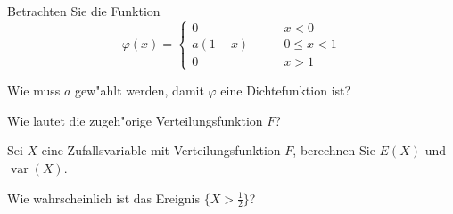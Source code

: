 Betrachten Sie die Funktion
\[
\varphi(x)=\begin{cases}
0&\qquad x < 0 \\
a(1 - x)&\qquad 0 \le x < 1\\
0&\qquad x>1
\end{cases}
\]
\begin{teilaufgaben}
\item Wie muss $a$ gew"ahlt werden, damit $\varphi$ eine Dichtefunktion
ist?
\item Wie lautet die zugeh"orige Verteilungsfunktion $F$?
\item Sei $X$ eine Zufallsvariable mit Verteilungsfunktion $F$, berechnen
Sie $E(X)$ und $\operatorname{var}(X)$.
\item Wie wahrscheinlich ist das Ereignis $\{ X > \frac12\}$?
\end{teilaufgaben}

